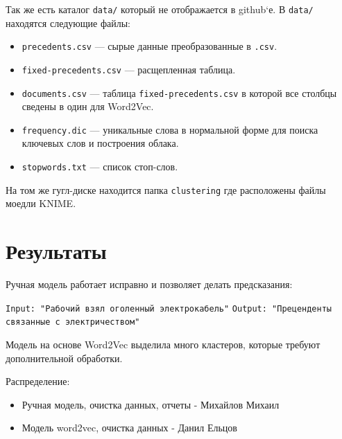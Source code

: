 \documentclass{article}
\begin{document}
Так же есть каталог \texttt{data/} который не отображается в github`е.
В \texttt{data/} находятся следующие файлы:
\begin{itemize}
    \item \texttt{precedents.csv} --- сырые данные преобразованные в \texttt{.csv}.
    \item \texttt{fixed-precedents.csv} --- расщепленная таблица. 
    \item \texttt{documents.csv} --- таблица \texttt{fixed-precedents.csv} в которой все столбцы сведены в один для Word2Vec.
    \item \texttt{frequency.dic} --- уникальные слова в нормальной форме для поиска ключевых слов и построения облака.  
    \item \texttt{stopwords.txt} --- список стоп-слов.
\end{itemize}

На том же гугл-диске находится папка \texttt{clustering} где расположены файлы моедли KNIME. 

\section{Результаты}

Ручная модель работает исправно и позволяет делать предсказания:

\texttt{Input: "Рабочий взял оголенный электрокабель"}
\texttt{Output: "Преценденты связанные с электричеством"}

Модель на основе Word2Vec выделила много кластеров, которые требуют дополнительной обработки.

Распределение:
\begin{itemize}
    \item Ручная модель, очистка данных, отчеты - Михайлов Михаил
    \item Модель word2vec, очистка данных - Данил Ельцов
\end{itemize}
\end{document}
